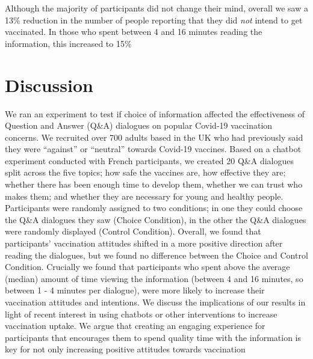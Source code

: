 \documentclass[
  english,
  ,jou,floatsintext]{apa6}
\begin{document}
Although the majority of participants did not change their mind, overall we saw a 13\% reduction in the number of people reporting that they did \emph{not} intend to get vaccinated. In those who spent between 4 and 16 minutes reading the information, this increased to 15\%

\hypertarget{discussion}{%
\section{Discussion}\label{discussion}}

We ran an experiment to test if choice of information affected the effectiveness of Question and Answer (Q\&A) dialogues on popular Covid-19 vaccination concerns. We recruited over 700 adults based in the UK who had previously said they were ``against'' or ``neutral'' towards Covid-19 vaccines. Based on a chatbot experiment conducted with French participants, we created 20 Q\&A dialogues split across the five topics; how safe the vaccines are, how effective they are; whether there has been enough time to develop them, whether we can trust who makes them; and whether they are necessary for young and healthy people. Participants were randomly assigned to two conditions; in one they could choose the Q\&A dialogues they saw (Choice Condition), in the other the Q\&A dialogues were randomly displayed (Control Condition). Overall, we found that participants' vaccination attitudes shifted in a more positive direction after reading the dialogues, but we found no difference between the Choice and Control Condition. Crucially we found that participants who spent above the average (median) amount of time viewing the information (between 4 and 16 minutes, so between 1 - 4 minutes per dialogue), were more likely to increase their vaccination attitudes and intentions. We discuss the implications of our results in light of recent interest in using chatbots or other interventions to increase vaccination uptake. We argue that creating an engaging experience for participants that encourages them to spend quality time with the information is key for not only increasing positive attitudes towards vaccination
\end{document}
